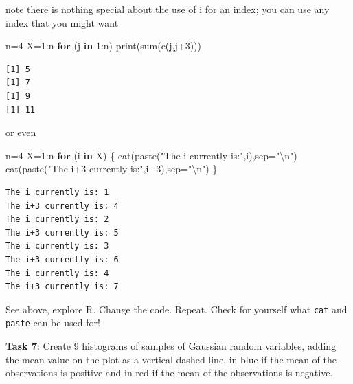 \documentclass[
  letterpaper,
  DIV=11,
  numbers=noendperiod]{scrartcl}
\newenvironment{Shaded}{\begin{snugshade}}{\end{snugshade}}
\newcommand{\AttributeTok}[1]{\textcolor[rgb]{0.40,0.45,0.13}{#1}}
\newcommand{\ControlFlowTok}[1]{\textcolor[rgb]{0.00,0.23,0.31}{\textbf{#1}}}
\newcommand{\DecValTok}[1]{\textcolor[rgb]{0.68,0.00,0.00}{#1}}
\newcommand{\FunctionTok}[1]{\textcolor[rgb]{0.28,0.35,0.67}{#1}}
\newcommand{\NormalTok}[1]{\textcolor[rgb]{0.00,0.23,0.31}{#1}}
\newcommand{\OtherTok}[1]{\textcolor[rgb]{0.00,0.23,0.31}{#1}}
\newcommand{\SpecialCharTok}[1]{\textcolor[rgb]{0.37,0.37,0.37}{#1}}
\newcommand{\StringTok}[1]{\textcolor[rgb]{0.13,0.47,0.30}{#1}}
\begin{document}
note there is nothing special about the use of i for an index; you can
use any index that you might want

\begin{Shaded}
\begin{Highlighting}[]
\NormalTok{n}\OtherTok{=}\DecValTok{4}
\NormalTok{X}\OtherTok{=}\DecValTok{1}\SpecialCharTok{:}\NormalTok{n}
\ControlFlowTok{for}\NormalTok{ (j }\ControlFlowTok{in} \DecValTok{1}\SpecialCharTok{:}\NormalTok{n) }\FunctionTok{print}\NormalTok{(}\FunctionTok{sum}\NormalTok{(}\FunctionTok{c}\NormalTok{(j,j}\SpecialCharTok{+}\DecValTok{3}\NormalTok{)))}
\end{Highlighting}
\end{Shaded}

\begin{verbatim}
[1] 5
[1] 7
[1] 9
[1] 11
\end{verbatim}

or even

\begin{Shaded}
\begin{Highlighting}[]
\NormalTok{n}\OtherTok{=}\DecValTok{4}
\NormalTok{X}\OtherTok{=}\DecValTok{1}\SpecialCharTok{:}\NormalTok{n}
\ControlFlowTok{for}\NormalTok{ (i }\ControlFlowTok{in}\NormalTok{ X) \{}
  \FunctionTok{cat}\NormalTok{(}\FunctionTok{paste}\NormalTok{(}\StringTok{"The i currently is:"}\NormalTok{,i),}\AttributeTok{sep=}\StringTok{"}\SpecialCharTok{\textbackslash{}n}\StringTok{"}\NormalTok{)}
  \FunctionTok{cat}\NormalTok{(}\FunctionTok{paste}\NormalTok{(}\StringTok{"The i+3 currently is:"}\NormalTok{,i}\SpecialCharTok{+}\DecValTok{3}\NormalTok{),}\AttributeTok{sep=}\StringTok{"}\SpecialCharTok{\textbackslash{}n}\StringTok{"}\NormalTok{)}
\NormalTok{  \}}
\end{Highlighting}
\end{Shaded}

\begin{verbatim}
The i currently is: 1
The i+3 currently is: 4
The i currently is: 2
The i+3 currently is: 5
The i currently is: 3
The i+3 currently is: 6
The i currently is: 4
The i+3 currently is: 7
\end{verbatim}

See above, explore R. Change the code. Repeat. Check for yourself what
\texttt{cat} and \texttt{paste} can be used for!

\textbf{Task 7}: Create 9 histograms of samples of Gaussian random
variables, adding the mean value on the plot as a vertical dashed line,
in blue if the mean of the observations is positive and in red if the
mean of the observations is negative.
\end{document}
